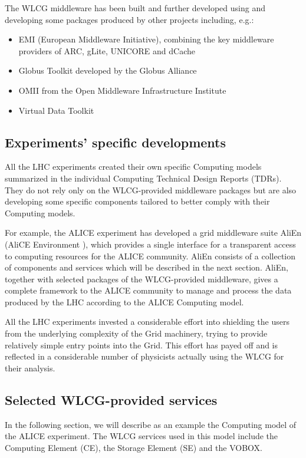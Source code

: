 The WLCG middleware has been built and further developed using and
developing some packages produced by other projects including, e.g.:
%
\begin{itemize}
\item EMI (European Middleware Initiative)\cite{EMI}, combining the key
middleware providers of ARC, gLite, UNICORE and dCache
\item Globus Toolkit \cite{globus} developed by the Globus Alliance
\item OMII from the Open Middleware Infrastructure Institute \cite{OMII}
\item Virtual Data Toolkit \cite{VDT}
\end{itemize}

\subsection{Experiments' specific developments}
%
All the LHC experiments created their own specific Computing models
summarized in the individual Computing Technical Design Reports (TDRs).
They do not rely only on the WLCG-provided middleware packages
but are also developing
some specific components tailored to better comply with their
Computing models.

For example, the ALICE experiment has developed a grid middleware
suite AliEn  (AliCE Environment \cite{AliEn}), which provides a single
interface for a transparent access to computing resources for the
ALICE community. AliEn consists of a collection of components and
services which will be described in the next section. AliEn, together
with selected packages of the WLCG-provided middleware, gives a
complete framework to the ALICE community to manage and process the
data produced by the LHC according to the ALICE Computing model.

All the LHC experiments invested a considerable effort into
shielding the users from the underlying complexity of the Grid
machinery, trying to provide relatively simple entry points into the
Grid. This effort has payed off and is reflected in a considerable
number of physicists actually using the WLCG for their analysis.

\subsection{Selected WLCG-provided services}
%
In the following section, we will describe as an example the
Computing model of the ALICE experiment. The WLCG services used in
this model include the Computing Element (CE), the Storage Element
(SE) and the VOBOX.

